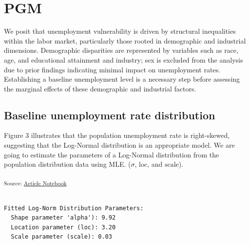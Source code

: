 \documentclass[
]{agujournal2019}
\begin{document}
\section{PGM}\label{pgm}

We posit that unemployment vulnerability is driven by structural
inequalities within the labor market, particularly those rooted in
demographic and industrial dimensions. Demographic disparities are
represented by variables such as race, age, and educational attainment
and industry; sex is excluded from the analysis due to prior findings
indicating minimal impact on unemployment rates. Establishing a baseline
unemployment level is a necessary step before assessing the marginal
effects of these demographic and industrial factors.

\subsection{Baseline unemployment rate
distribution}\label{baseline-unemployment-rate-distribution}

Figure 3 illustrates that the population unemployment rate is
right-skewed, suggesting that the Log-Normal distribution is an
appropriate model. We are going to estimate the parameters of a
Log-Normal distribution from the population distribution data using MLE.
(\(\sigma\), \(\text{loc}\), and \(\text{scale}\)).

\textsubscript{Source:
\href{https://mw1296.github.io/dsan5650_social_causal_inference/index.qmd.html}{Article
Notebook}}

\begin{verbatim}

Fitted Log-Norm Distribution Parameters:
  Shape parameter 'alpha'): 9.92
  Location parameter (loc): 3.20
  Scale parameter (scale): 0.03
\end{verbatim}
\end{document}
